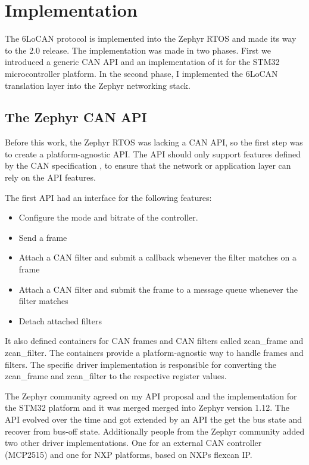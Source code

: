 \chapter{Implementation}
\label{cha:implementation}

The 6LoCAN protocol is implemented into the Zephyr RTOS and made its way to the 2.0 release.
The implementation was made in two phases.
First we introduced a generic CAN API and an implementation of it for the STM32 microcontroller platform.
In the second phase, I implemented the 6LoCAN translation layer into the Zephyr networking stack.

\section{The Zephyr CAN API}
\label{sec:can_api}
Before this work, the Zephyr RTOS was lacking a CAN API, so the first step was to create a platform-agnostic API.
The API should only support features defined by the CAN specification \cite{BoschCAN},
to ensure that the network or application layer can rely on the API features.

The first API had an interface for the following features:
\begin{itemize}
        \item Configure the mode and bitrate of the controller.
        \item Send a frame
        \item Attach a CAN filter and submit a callback whenever the filter matches on a frame
        \item Attach a CAN filter and submit the frame to a message queue whenever the filter matches
        \item Detach attached filters
\end{itemize}

It also defined containers for CAN frames and CAN filters called zcan\_frame and zcan\_filter.
The containers provide a platform-agnostic way to handle frames and filters.
The specific driver implementation is responsible for converting the zcan\_frame and zcan\_filter to the respective register values.

The Zephyr community agreed on my API proposal and the implementation for the STM32 platform and it was merged merged into Zephyr version 1.12.
The API evolved over the time and got extended by an API the get the bus state and recover from bus-off state.
Additionally people from the Zephyr community added two other driver implementations.
One for an external CAN controller (MCP2515) and one for NXP platforms, based on NXPs flexcan IP.

